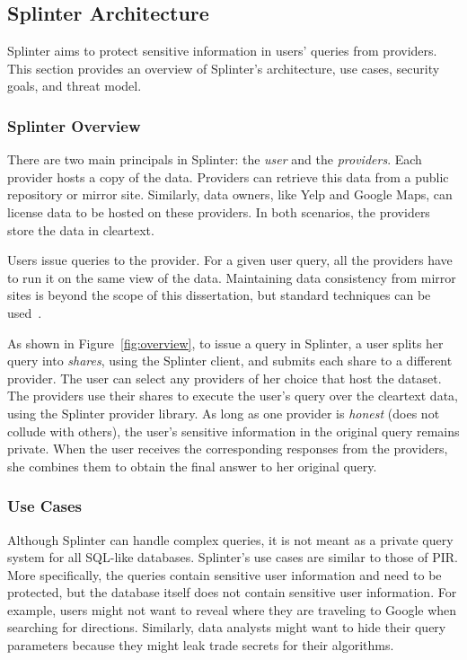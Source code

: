 \subsection{Splinter Architecture}
\label{sec:goals}

Splinter aims to protect sensitive information in users' queries
from providers. This section provides an overview of Splinter's architecture,
use cases, security goals, and threat model.

\subsubsection{Splinter Overview}
\label{sec:model}
There are two main principals in Splinter: the \emph{user} and the \emph{providers}.
Each provider hosts a copy of the data. Providers can 
retrieve this data from a public repository or mirror site.
Similarly, data owners, like Yelp and Google Maps, can license
data to be hosted on these providers. In both scenarios,
the providers store the data in cleartext. 

Users issue queries to the provider.
For a given user query, all the providers have to run it on the same
view of the data. Maintaining data consistency
from mirror sites is beyond the scope of this dissertation, but
standard techniques can be used~\cite{tewari2002wcdp,chi2008novel}.

As shown in Figure~\ref{fig:overview}, 
to issue a query in Splinter, a user
splits her query into \textit{shares}, using the Splinter client,
and submits each share to a different provider.
The user can select any providers of her choice that host the dataset.
The providers use their shares to execute the user's query 
over the cleartext data, using the Splinter provider library. 
As long as one provider is \textit{honest}
(does not collude with others), the user's sensitive information in the original query
remains private. When the user receives the corresponding responses from the providers,
she combines them to obtain the final answer to her original query. 

\subsubsection{Use Cases}
\label{sec:splinter_cases}
Although Splinter can handle complex queries, it is not
meant as a private query system for all SQL-like databases.
Splinter's use cases are similar to those of PIR. More specifically,
the queries contain sensitive user information and need to be 
protected, but the database itself does not contain
sensitive user information. For example, users might not
want to reveal where they are traveling to Google when searching
for directions. Similarly, data analysts might want to hide
their query parameters because they might leak trade
secrets for their algorithms.

